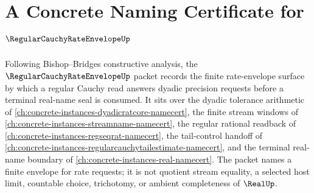\chapter{A Concrete Naming Certificate for $\RegularCauchyRateEnvelopeUp$}
\label{ch:concrete-instances-regular-cauchy-rate-envelope-namecert}

Following Bishop--Bridges constructive analysis, the $\RegularCauchyRateEnvelopeUp$ packet records the finite rate-envelope surface by which a regular Cauchy read answers dyadic precision requests before a terminal real-name seal is consumed. It sits over the dyadic tolerance arithmetic of \autoref{ch:concrete-instances-dyadicratcore-namecert}, the finite stream windows of \autoref{ch:concrete-instances-streamname-namecert}, the regular rational readback of \autoref{ch:concrete-instances-regseqrat-namecert}, the tail-control handoff of \autoref{ch:concrete-instances-regularcauchytailestimate-namecert}, and the terminal real-name boundary of \autoref{ch:concrete-instances-real-namecert}. The packet names a finite envelope for rate requests; it is not quotient stream equality, a selected host limit, countable choice, trichotomy, or ambient completeness of $\RealUp$.

